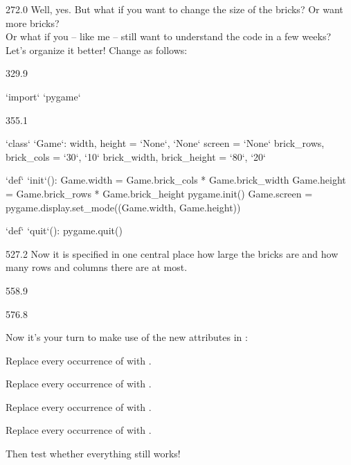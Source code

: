 \documentclass{aslab}
\newcommand*\Kw[1]{\textcolor{codeorange}{#1}}  %
\newcommand*\Cy[1]{\textcolor{codecyan}{#1}}    %
\newcommand*\Nu[1]{\textcolor{codered}{#1}}     %
\newcommand*\Mg[1]{\textcolor{codemagenta}{#1}} %
\newcommand*\Bl[1]{\textcolor{aslabblue}{#1}}   %
\begin{document}
\begin{region}[pitch=13.33]{272.0}
Well, yes. But what if you want to change the size of the bricks? Or want
more bricks?\\
Or what if you -- like me -- still want to understand the code in a few
weeks?\\
Let's organize it better! Change  as follows:
\end{region}

\begin{region}{329.9}
\begin{codeblock}[escapechar=`]
`\Mg{import}` `\Bl{pygame}`
\end{codeblock}
\end{region}

\begin{region}[pitch=12]{355.1}
\begin{codeblock}[escapechar=`]
`\Kw{class}` `\Cy{Game}`:
    width, height = `\Cy{None}`, `\Cy{None}`
    screen = `\Cy{None}`
    brick_rows, brick_cols = `\Nu{30}`, `\Nu{10}`
    brick_width, brick_height = `\Nu{80}`, `\Nu{20}`

    `\Kw{def}` `\Cy{init}`():
        Game.width = Game.brick_cols * Game.brick_width
        Game.height = Game.brick_rows * Game.brick_height
        pygame.init()
        Game.screen = pygame.display.set_mode((Game.width, Game.height))

    `\Kw{def}` `\Cy{quit}`():
        pygame.quit()
\end{codeblock}
\end{region}

\begin{region}[pitch=13.2]{527.2}
Now it is specified in one central place how large the bricks are and how
many rows and columns there are at most.
\end{region}

\begin{region}{558.9}
\end{region}

\begin{region}[pitch=13.5]{576.8}
\begin{tasks}
\item Now it's your turn to make use of the new  attributes in
  :
  \begin{dotlist}
  \item Replace every occurrence of  with .
  \item Replace every occurrence of  with .
  \item Replace every occurrence of  with .
  \item Replace every occurrence of  with
    .
  \end{dotlist}
  Then test whether everything still works!
\end{tasks}
\end{region}
\end{document}
